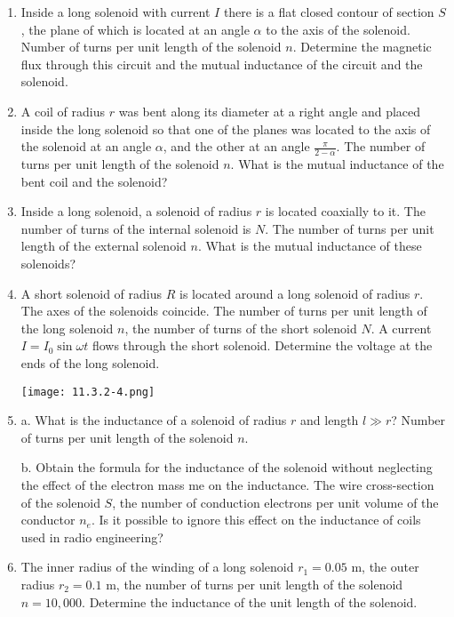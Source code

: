 \documentclass{article}
\begin{document}
\begin{enumerate}[label=11.3.\arabic*]

\item Inside a long solenoid with current $I$ there is a flat closed contour of section $S$, the plane of which is located at an angle $\alpha$ to the axis of the solenoid. Number of turns per unit length of the solenoid $n$. Determine the magnetic flux through this circuit and the mutual inductance of the circuit and the solenoid.

\item A coil of radius $r$ was bent along its diameter at a right angle and placed inside the long solenoid so that one of the planes was located to the axis of the solenoid at an angle $\alpha$, and the other at an angle $\frac{\pi}{2 - \alpha}$. The number of turns per unit length of the solenoid $n$. What is the mutual inductance of the bent coil and the solenoid?

\item Inside a long solenoid, a solenoid of radius $r$ is located coaxially to it. The number of turns of the internal solenoid is $N$. The number of turns per unit length of the external solenoid $n$. What is the mutual inductance of these solenoids?

\item A short solenoid of radius $R$ is located around a long solenoid of radius $r$. The axes of the solenoids coincide. The number of turns per unit length of the long solenoid $n$, the number of turns of the short solenoid $N$. A current $I = I_0 \sin \omega t$ flows through the short solenoid. Determine the voltage at the ends of the long solenoid.

\begin{center}
    \texttt{[image: 11.3.2-4.png]}
\end{center}

\item a. What is the inductance of a solenoid of radius $r$ and length $l \gg r$? Number of turns per unit length of the solenoid $n$.

b. Obtain the formula for the inductance of the solenoid without neglecting the effect of the electron mass me on the inductance. The wire cross-section of the solenoid $S$, the number of conduction electrons per unit volume of the conductor $n_e$. Is it possible to ignore this effect on the inductance of coils used in radio engineering?

\item The inner radius of the winding of a long solenoid $r_1 = 0.05$ m, the outer radius $r_2 = 0.1$ m, the number of turns per unit length of the solenoid $n = 10,000$. Determine the inductance of the unit length of the solenoid.


\end{enumerate}
\end{document}
